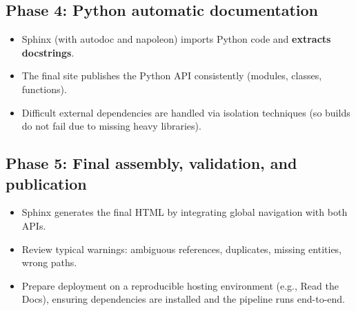 \documentclass[11pt,a4paper]{article}
\begin{document}
\subsection{Phase 4: Python automatic documentation}
\begin{itemize}[leftmargin=*,itemsep=2pt]
  \item Sphinx (with autodoc and napoleon) imports Python code and \textbf{extracts docstrings}.
  \item The final site publishes the Python API consistently (modules, classes, functions).
  \item Difficult external dependencies are handled via isolation techniques (so builds do not fail due to missing heavy libraries).
\end{itemize}

\subsection{Phase 5: Final assembly, validation, and publication}
\begin{itemize}[leftmargin=*,itemsep=2pt]
  \item Sphinx generates the final HTML by integrating global navigation with both APIs.
  \item Review typical warnings: ambiguous references, duplicates, missing entities, wrong paths.
  \item Prepare deployment on a reproducible hosting environment (e.g., Read the Docs), ensuring dependencies are installed and the pipeline runs end-to-end.
\end{itemize}
\end{document}

